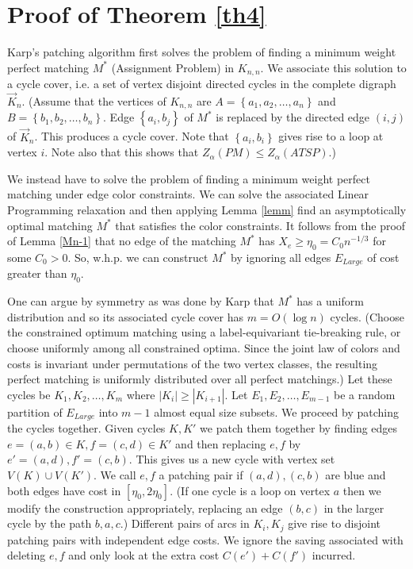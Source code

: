 \documentclass[12pt]{article}
\newcommand{\1}{\textbf{1}}
\def\a{\alpha} \def\b{\beta} \def\d{\delta} \def\D{\Delta}
\newcommand{\set}[1]{\left\{#1\right\}}
\begin{document}
\section{Proof of Theorem \ref{th4}}
Karp's patching algorithm first solves the problem of finding a minimum weight perfect matching $M^*$ (Assignment Problem) in $K_{n,n}$. We associate this solution to a cycle cover, i.e. a set of vertex disjoint directed cycles in the complete digraph $\vec K_n$. (Assume that the vertices of $K_{n,n}$ are $A=\set{a_1,a_2,\ldots,a_n}$ and $B=\set{b_1,b_2,\ldots,b_n}$. Edge $\set{a_i,b_j}$ of $M^*$ is replaced by the directed edge $(i,j)$ of $\vec K_n$. This produces a cycle cover. Note that $\set{a_i,b_i}$ gives rise to a loop at vertex $i$. Note also that this shows that $Z_\a(PM)\leq Z_\a(ATSP)$.)

We instead have to solve the problem of finding a minimum weight perfect matching under edge color constraints.  We can solve the associated Linear Programming relaxation and then applying Lemma \ref{lemm} find an asymptotically optimal matching $M^*$ that satisfies the color constraints. It follows from the proof of Lemma \ref{Mn-1} that no edge of the matching $M^*$ has $X_e\geq \eta_0=C_0n^{-1/3}$ for some $C_0>0$. So, w.h.p. we can construct $M^*$ by ignoring all edges $E_{Large}$ of cost greater than $\eta_0$. 

One can argue by symmetry as was done by Karp \cite{Karp} that $M^*$ has a uniform distribution and so its associated cycle cover has $m=O(\log n)$ cycles. (Choose the constrained optimum matching using a label-equivariant tie-breaking rule, or choose uniformly among all constrained optima. Since the joint law of colors and costs is invariant under permutations of the two vertex classes, the resulting perfect matching is uniformly distributed over all perfect matchings.) Let these cycles be $K_1,K_2,\ldots,K_m$ where $|K_i|\geq |K_{i+1}|$. Let $E_1,E_2,\ldots,E_{m-1}$ be a random partition of $E_{Large}$ into $m-1$ almost equal size subsets. We proceed by patching the cycles together. Given cycles $K,K'$ we patch them together by finding edges $e=(a,b)\in K,f=(c,d)\in K'$ and then replacing $e,f$ by $e'=(a,d),f'=(c,b)$. This gives us a new cycle with vertex set $V(K)\cup V(K')$. We call $e,f$ a patching pair if $(a,d),(c,b)$ are blue and both edges have cost in $[\eta_0,2\eta_0]$.  (If one cycle is a loop on vertex $a$ then we modify the construction appropriately, replacing an edge $(b,c)$ in the larger cycle by the path $b,a,c$.) Different pairs of arcs in $K_i,K_j$ give rise to disjoint patching pairs with independent edge costs. We ignore the saving associated with deleting $e,f$ and only look at the extra cost $C(e')+C(f')$ incurred. 
\end{document}
